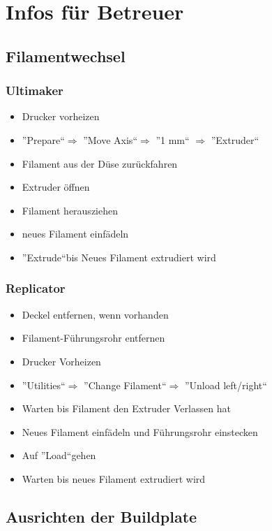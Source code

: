 \documentclass{\basedir/fablab-document}
\begin{document}
\section{Infos für Betreuer}

\subsection{Filamentwechsel}\label{filamentwechsel}

\subsubsection{Ultimaker}

\begin{itemize}
\item Drucker vorheizen
\item ''Prepare``$\Rightarrow$ ''Move Axis``$\Rightarrow$ ''1 mm`` $\Rightarrow$ ''Extruder``
\item Filament aus der Düse zurückfahren
\item Extruder öffnen
\item Filament herausziehen
\item neues Filament einfädeln
\item ''Extrude``bis Neues Filament extrudiert wird
\end{itemize}

\subsubsection{Replicator}

\begin{itemize}
	\item Deckel entfernen, wenn vorhanden
	\item Filament-Führungsrohr entfernen
	\item Drucker Vorheizen
	\item ''Utilities``$\Rightarrow$ ''Change Filament``$\Rightarrow$ ''Unload left/right``
	\item Warten bis Filament den Extruder Verlassen hat 
	\item Neues Filament einfädeln und Führungsrohr einstecken
	\item Auf ''Load``gehen
	\item Warten bis neues Filament extrudiert wird
\end{itemize}

\subsection{Ausrichten der Buildplate}
\end{document}
